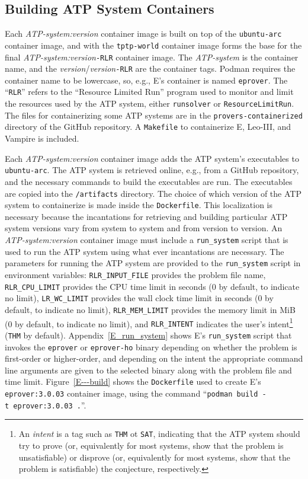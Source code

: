 \documentclass{easychair}
\begin{document}
\subsection{Building ATP System Containers}
\label{BuildingATPSystemImages}

Each {\em ATP-system:version} container image is built on top of the {\tt ubuntu-arc} container 
image, and with the {\tt tptp-world} container image forms the base for the final 
{\em ATP-system:version}{\tt -RLR} container image.
The {\em ATP-system} is the container name, and the {\em version}/{\em version}{\tt -RLR} are 
the container tags.
Podman requires the container name to be lowercase, so, e.g., E's container is named {\tt eprover}.
The ``{\tt RLR}'' refers to the ``Resource Limited Run'' program used to monitor and limit the 
resources used by the ATP system, either {\tt runsolver} or {\tt ResourceLimitRun}.
The files for containerizing some ATP systems are in the {\tt provers-containerized} directory 
of the GitHub repository.
A {\tt Makefile} to containerize E, Leo-III, and Vampire is included.

Each {\em ATP-system:version} container image adds the ATP system's executables to 
{\tt ubuntu-arc}.
The ATP system is retrieved online, e.g., from a GitHub repository, and the necessary commands
to build the executables are run.
The executables are copied into the {\tt /artifacts} directory.
The choice of which version of the ATP system to containerize is made inside the {\tt Dockerfile}.
This localization is necessary because the incantations for retrieving and building particular 
ATP system versions vary from system to system and from version to version.
An {\em ATP-system:version} container image must include a {\tt run\_system} script that is used 
to run the ATP system using what ever incantations are necessary.
The parameters for running the ATP system are provided to the {\tt run\_system} script in 
environment variables:
{\tt RLR\_INPUT\_FILE} provides the problem file name,
{\tt RLR\_CPU\_LIMIT} provides the CPU time limit in seconds (0 by default, to indicate no limit),
{\tt LR\_WC\_LIMIT} provides the wall clock time limit in seconds (0 by default, to indicate no 
limit),
{\tt RLR\_MEM\_LIMIT} provides the memory limit in MiB (0 by default, to indicate no limit),
and
{\tt RLR\_INTENT} indicates the user's intent\footnote{%
An {\em intent} is a tag such as {\tt THM} ot {\tt SAT}, indicating that the ATP system should
try to prove (or, equivalently for most systems, show that the problem is unsatisfiable) or 
disprove (or, equivalently for most systems, show that the problem is satisfiable) the conjecture, 
respectively.}
({\tt THM} by default).
Appendix~\ref{E_run_system} shows E's {\tt run\_system} script that invokes the {\tt eprover} 
or {\tt eprover-ho} binary depending on whether the problem is first-order or higher-order, 
and depending on the intent the appropriate command line arguments are given to the selected 
binary along with the problem file and time limit. 
Figure~\ref{E---build} shows the {\tt Dockerfile} used to create E's {\tt eprover:3.0.03} 
container image, using the command ``{\tt podman~build~-t~eprover:3.0.03~.}''.
\end{document}
